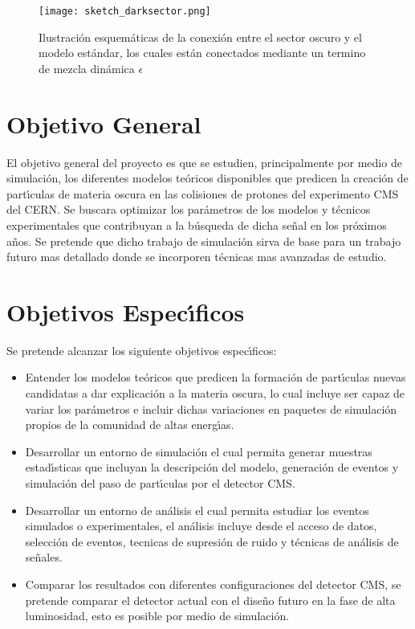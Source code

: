 \begin{figure}
\begin{center}
  \texttt{[image: sketch\_darksector.png]}
  \caption{Ilustraci\'on esquem\'aticas de la conexi\'on entre el sector oscuro y el modelo est\'andar, los cuales est\'an conectados mediante un termino de mezcla din\'amica $\epsilon$}
  \label{fig:AMS_positron}
\end{center}
\end{figure}


\chapter{Objetivo General}

El objetivo general del proyecto es que se estudien, principalmente por medio de simulaci\'on, los diferentes modelos te\'oricos disponibles que predicen la creaci\'on de part\'{\i}culas de materia oscura en las colisiones de protones del experimento CMS del CERN.  Se buscara optimizar los par\'ametros de los modelos y t\'ecnicos experimentales que contribuyan a la b\'usqueda de dicha se\~nal en los pr\'oximos a\~nos.   Se pretende que dicho trabajo de simulaci\'on sirva de base para un trabajo futuro mas detallado donde se incorporen t\'ecnicas mas avanzadas de estudio. 


\chapter{Objetivos Espec\'{\i}ficos}

Se pretende alcanzar los siguiente objetivos espec\'{\i}ficos: 

\begin{itemize}
\item Entender los modelos te\'oricos que predicen la formaci\'on de part\'{\i}culas nuevas candidatas a dar explicaci\'on a la materia oscura, lo cual incluye ser capaz de variar los par\'ametros e incluir dichas variaciones en paquetes de simulaci\'on propios de la comunidad de altas energ\'{\i}as. 
\item Desarrollar un entorno de simulaci\'on el cual permita generar muestras estad\'{\i}sticas que incluyan la descripci\'on del modelo, generaci\'on de eventos y simulaci\'on del paso de part\'{\i}culas por el detector CMS. 
 \item Desarrollar un entorno de an\'alisis el cual permita estudiar los eventos simulados o experimentales, el an\'alisis incluye desde el acceso de datos, selecci\'on de eventos, tecnicas de supresi\'on de ruido y t\'ecnicas de an\'alisis de se\~nales. 
\item Comparar los resultados con diferentes configuraciones del detector CMS, se pretende comparar el detector actual con el dise\~no futuro en la fase de alta luminosidad, esto es posible por medio de simulaci\'on. 
  
\end{itemize}


